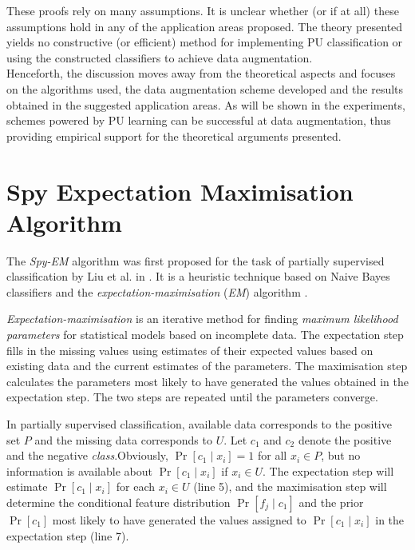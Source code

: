 \documentclass[12pt,twoside,notitlepage,amsart]{report} %
\begin{document}
	These proofs rely on many assumptions. It is unclear whether (or if at all) these assumptions hold in any of the application areas proposed. The theory presented yields no constructive (or efficient) method for implementing PU classification or using the constructed classifiers to achieve data augmentation. \\
	
	Henceforth, the discussion moves away from the theoretical aspects and focuses on the algorithms used, the data augmentation scheme developed and the results obtained in the suggested application areas. As will be shown in the experiments, schemes powered by PU learning can be successful at data augmentation, thus providing empirical support for the theoretical arguments presented.   
	
	\clearpage
	\section{Spy Expectation Maximisation Algorithm} %
	
	The \emph{Spy-EM} algorithm was first proposed for the task of partially supervised classification by Liu et al. in \cite{Liu02}. It is a heuristic technique based on Naive Bayes classifiers and the \emph{expectation-maximisation} (\emph{EM}) algorithm \cite{Liu02}. 
	
	\emph{Expectation-maximisation} is an iterative method for finding \emph{maximum likelihood parameters} for statistical models based on incomplete data. The {expectation step} fills in the missing values using estimates of their expected values based on existing data and the {current estimates} of the parameters. The {maximisation step} calculates the parameters most likely to have generated the values obtained in the {expectation step}. The two steps are repeated until the parameters converge. 
	
	In partially supervised classification, available data corresponds to the positive set $P$ and the missing data corresponds to $U$. Let $c_1$ and $c_2$ denote the positive and the negative \emph{class}.\footnotemark[1] Obviously, $\Pr[c_1 \mid x_i] = 1$ for all $x_i \in P$, but no information is available about $\Pr[c_1 \mid x_i]$ if $x_i \in U$. The expectation step will estimate $\Pr[c_1 \mid x_i]$ for each $x_i \in U$ (line 5), and the maximisation step will determine the conditional feature distribution $\Pr[f_j \mid c_1]$ and the prior $\Pr[c_1]$ most likely to have generated the values assigned to $\Pr[c_1 \mid x_i]$ in the expectation step (line 7). 
	
\end{document}
